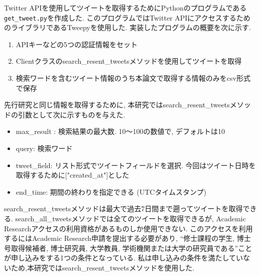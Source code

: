Twitter APIを使用してツイートを取得するためにPythonのプログラムである\verb|get_tweet.py|を作成した. このプログラムではTwitter APIにアクセスするためのライブラリであるTweepy\cite{tweepy}を使用した. 
実装したプログラムの概要を次に示す.
\begin{enumerate}
  \item APIキーなどの5つの認証情報をセット
  \item Clientクラスのsearch\_resent\_tweetsメソッドを使用してツイートを取得
  \item 検索ワードを含むツイート情報のうち本論文で取得する情報のみをcsv形式で保存
\end{enumerate}
先行研究と同じ情報を取得するために, 本研究ではsearch\_resent\_tweetsメソッドの引数として次に示すものを与えた. 
\begin{itemize}
 \item max\_result : 検索結果の最大数. 10〜100の数値で, デフォルトは10
 \item query: 検索ワード
 \item tweet\_field: リスト形式でツイートフィールドを選択. 今回はツイート日時を取得するために["created\_at"]とした
 \item end\_time: 期間の終わりを指定できる (UTCタイムスタンプ) 
\end{itemize}
search\_resent\_tweetsメソッドは最大で過去7日間まで遡ってツイートを取得できる. search\_all\_tweetsメソッドでは全てのツイートを取得できるが, Academic Researchアクセスの利用資格があるものしか使用できない. このアクセスを利用するにはAcademic Research申請を提出する必要があり, ``修士課程の学生, 博士号取得候補者, 博士研究員, 大学教員, 学術機関または大学の研究員である''ことが申し込みをする1つの条件となっている\cite{academic-research}. 
私は申し込みの条件を満たしていないため,本研究ではsearch\_resent\_tweetsメソッドを使用した. 


